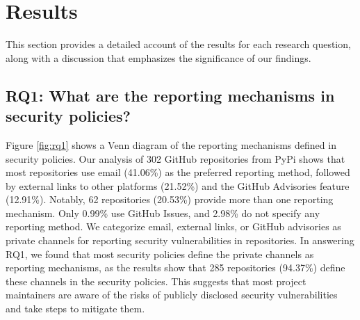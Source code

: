 \section{Results}
\label{4_results}

This section provides a detailed account of the results for each research question, along with a discussion that emphasizes the significance of our findings.




\subsection{RQ1: What are the reporting mechanisms in security policies?}




Figure \ref{fig:rq1} shows a Venn diagram of the reporting mechanisms defined in security policies. Our analysis of 302 GitHub repositories from PyPi shows that most repositories use email (41.06\%) as the preferred reporting method, followed by external links to other platforms (21.52\%) and the GitHub Advisories feature (12.91\%). Notably, 62 repositories (20.53\%) provide more than one reporting mechanism. Only 0.99\% use GitHub Issues, and 2.98\% do not specify any reporting method. We categorize email, external links, or GitHub advisories as private channels for reporting security vulnerabilities in repositories. In answering RQ1, we found that most security policies define the private channels as reporting mechanisms, as the results show that 285 repositories (94.37\%) define these channels in the security policies. This suggests that most project maintainers are aware of the risks of publicly disclosed security vulnerabilities and take steps to mitigate them.

